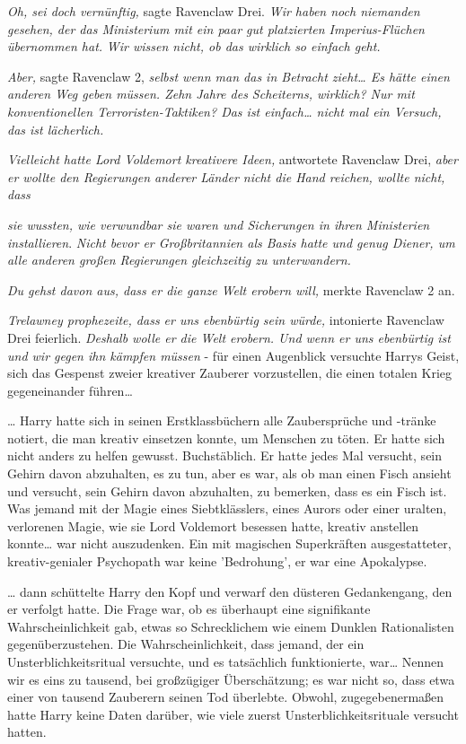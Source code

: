 {\emph{Oh, sei doch vernünftig,} sagte Ravenclaw Drei. \emph{Wir haben noch niemanden gesehen, der das Ministerium mit ein paar gut platzierten Imperius-Flüchen übernommen hat.} \emph{Wir wissen nicht, ob das wirklich so einfach geht.}

\emph{Aber,} sagte Ravenclaw 2, \emph{selbst wenn man das in Betracht zieht… Es hätte einen anderen Weg geben müssen. Zehn Jahre des Scheiterns, wirklich? Nur mit konventionellen Terroristen-Taktiken? Das ist einfach… nicht mal ein Versuch, das ist lächerlich.}

\emph{Vielleicht hatte Lord Voldemort kreativere Ideen,} antwortete Ravenclaw Drei, \emph{aber er wollte den Regierungen anderer Länder nicht die Hand reichen, wollte nicht, dass}

\emph{sie wussten, wie verwundbar sie waren und Sicherungen in ihren Ministerien installieren}. \emph{Nicht bevor er Großbritannien als Basis hatte und genug Diener, um alle anderen großen Regierungen gleichzeitig zu unterwandern.}

\emph{Du gehst davon aus, dass er die ganze Welt erobern will,} merkte Ravenclaw 2 an.

\emph{Trelawney prophezeite, dass er uns ebenbürtig sein würde,} intonierte Ravenclaw Drei feierlich. \emph{Deshalb wolle er die Welt erobern. Und wenn er uns ebenbürtig ist und wir gegen ihn kämpfen müssen} - für einen Augenblick versuchte Harrys Geist, sich das Gespenst zweier kreativer Zauberer vorzustellen, die einen totalen Krieg gegeneinander führen…

… Harry hatte sich in seinen Erstklassbüchern alle Zaubersprüche und -tränke notiert, die man kreativ einsetzen konnte, um Menschen zu töten. Er hatte sich nicht anders zu helfen gewusst. Buchstäblich. Er hatte jedes Mal versucht, sein Gehirn davon abzuhalten, es zu tun, aber es war, als ob man einen Fisch ansieht und versucht, sein Gehirn davon abzuhalten, zu bemerken, dass es ein Fisch ist. Was jemand mit der Magie eines Siebtklässlers, eines Aurors oder einer uralten, verlorenen Magie, wie sie Lord Voldemort besessen hatte, kreativ anstellen konnte… war nicht auszudenken. Ein mit magischen Superkräften ausgestatteter, kreativ-genialer Psychopath war keine 'Bedrohung', er war eine Apokalypse.

… dann schüttelte Harry den Kopf und verwarf den düsteren Gedankengang, den er verfolgt hatte. Die Frage war, ob es überhaupt eine signifikante Wahrscheinlichkeit gab, etwas so Schrecklichem wie einem Dunklen Rationalisten gegenüberzustehen. Die Wahrscheinlichkeit, dass jemand, der ein Unsterblichkeitsritual versuchte, und es tatsächlich funktionierte, war… Nennen wir es eins zu tausend, bei großzügiger Überschätzung; es war nicht so, dass etwa einer von tausend Zauberern seinen Tod überlebte. Obwohl, zugegebenermaßen hatte Harry keine Daten darüber, wie viele zuerst Unsterblichkeitsrituale versucht hatten.

}
